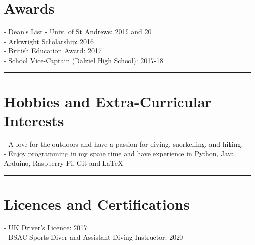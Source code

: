 %
%

\section*{Awards}
\begin{multicols}{2}
 - Dean’s List - Univ. of St Andrews: 2019 and 20\\
 - Arkwright Scholarship: 2016\\
 - British Education Award: 2017\\
 - School Vice-Captain (Dalziel High School): 2017-18
\end{multicols}

\noindent\rule[0.5ex]{\linewidth}{1pt}


\section*{Hobbies and Extra-Curricular Interests}
 - A love for the outdoors and have a passion for diving, snorkelling, and hiking.\\
 - Enjoy programming in my spare time and have experience in Python, Java, Arduino, Raspberry Pi, Git and \LaTeX

\noindent\rule[0.5ex]{\linewidth}{1pt}

\section*{Licences and Certifications}
 - UK Driver’s Licence: 2017\\
 - BSAC Sports Diver and Assistant Diving Instructor: 2020

